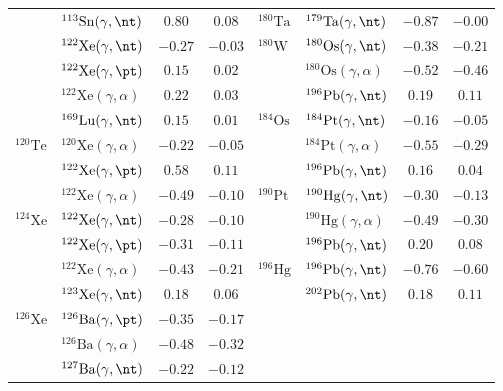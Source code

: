 {\begin{longtable}{llcc llcc}
$ $ & $^{113}\mathrm{Sn}(\gamma,\nt)$ & $0.80$ & $0.08$ & $^{180}\mathrm{Ta}$ & $^{179}\mathrm{Ta}(\gamma,\nt)$ & $-0.87$ & $-0.00$ \\ 
$ $ & $^{122}\mathrm{Xe}(\gamma,\nt)$ & $-0.27$ & $-0.03$ & $^{180}\mathrm{W}$ & $^{180}\mathrm{Os}(\gamma,\nt)$ & $-0.38$ & $-0.21$ \\ 
$ $ & $^{122}\mathrm{Xe}(\gamma,\pt)$ & $0.15$ & $0.02$ & $ $ & $^{180}\mathrm{Os}(\gamma,\alpha)$ & $-0.52$ & $-0.46$ \\ 
$ $ & $^{122}\mathrm{Xe}(\gamma,\alpha)$ & $0.22$ & $0.03$ & $ $ & $^{196}\mathrm{Pb}(\gamma,\nt)$ & $0.19$ & $0.11$ \\ 
$ $ & $^{169}\mathrm{Lu}(\gamma,\nt)$ & $0.15$ & $0.01$ & $^{184}\mathrm{Os}$ & $^{184}\mathrm{Pt}(\gamma,\nt)$ & $-0.16$ & $-0.05$ \\ 
$^{120}\mathrm{Te}$ & $^{120}\mathrm{Xe}(\gamma,\alpha)$ & $-0.22$ & $-0.05$ & $ $ & $^{184}\mathrm{Pt}(\gamma,\alpha)$ & $-0.55$ & $-0.29$ \\ 
$ $ & $^{122}\mathrm{Xe}(\gamma,\pt)$ & $0.58$ & $0.11$ & $ $ & $^{196}\mathrm{Pb}(\gamma,\nt)$ & $0.16$ & $0.04$ \\ 
$ $ & $^{122}\mathrm{Xe}(\gamma,\alpha)$ & $-0.49$ & $-0.10$ & $^{190}\mathrm{Pt}$ & $^{190}\mathrm{Hg}(\gamma,\nt)$ & $-0.30$ & $-0.13$ \\ 
$^{124}\mathrm{Xe}$ & $^{122}\mathrm{Xe}(\gamma,\nt)$ & $-0.28$ & $-0.10$ & $ $ & $^{190}\mathrm{Hg}(\gamma,\alpha)$ & $-0.49$ & $-0.30$ \\ 
$ $ & $^{122}\mathrm{Xe}(\gamma,\pt)$ & $-0.31$ & $-0.11$ & $ $ & $^{196}\mathrm{Pb}(\gamma,\nt)$ & $0.20$ & $0.08$ \\ 
$ $ & $^{122}\mathrm{Xe}(\gamma,\alpha)$ & $-0.43$ & $-0.21$ & $^{196}\mathrm{Hg}$ & $^{196}\mathrm{Pb}(\gamma,\nt)$ & $-0.76$ & $-0.60$ \\ 
$ $ & $^{123}\mathrm{Xe}(\gamma,\nt)$ & $0.18$ & $0.06$ & $ $ & $^{202}\mathrm{Pb}(\gamma,\nt)$ & $0.18$ & $0.11$ \\ 
$^{126}\mathrm{Xe}$ & $^{126}\mathrm{Ba}(\gamma,\pt)$ & $-0.35$ & $-0.17$ & $ $ & $ $ &  &  \\ 
$ $ & $^{126}\mathrm{Ba}(\gamma,\alpha)$ & $-0.48$ & $-0.32$ & $ $ & $ $ &  &  \\ 
$ $ & $^{127}\mathrm{Ba}(\gamma,\nt)$ & $-0.22$ & $-0.12$ & $ $ & $ $ &  &  \\ 
\end{longtable}
}